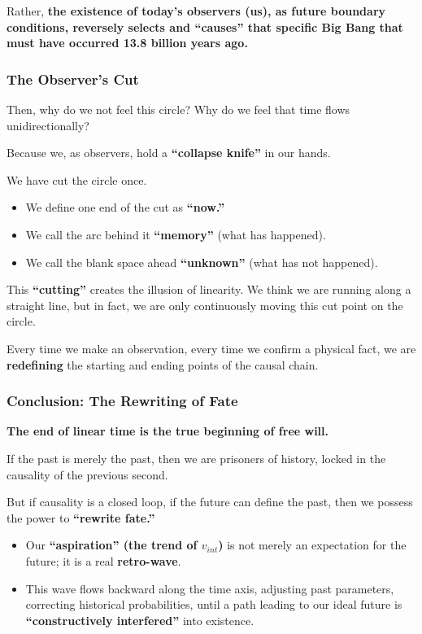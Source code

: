 Rather, \textbf{the existence of today's observers (us), as future boundary conditions, reversely selects and ``causes'' that specific Big Bang that must have occurred 13.8 billion years ago.}

\subsubsection{The Observer's Cut}

Then, why do we not feel this circle? Why do we feel that time flows unidirectionally?

Because we, as observers, hold a \textbf{``collapse knife''} in our hands.

We have cut the circle once.

\begin{itemize}
\item We define one end of the cut as \textbf{``now.''}

\item We call the arc behind it \textbf{``memory''} (what has happened).

\item We call the blank space ahead \textbf{``unknown''} (what has not happened).
\end{itemize}

This \textbf{``cutting''} creates the illusion of linearity. We think we are running along a straight line, but in fact, we are only continuously moving this cut point on the circle.

Every time we make an observation, every time we confirm a physical fact, we are \textbf{redefining} the starting and ending points of the causal chain.

\subsubsection{Conclusion: The Rewriting of Fate}

\textbf{The end of linear time is the true beginning of free will.}

If the past is merely the past, then we are prisoners of history, locked in the causality of the previous second.

But if causality is a closed loop, if the future can define the past, then we possess the power to \textbf{``rewrite fate.''}

\begin{itemize}
\item Our \textbf{``aspiration'' (the trend of $v_{int}$)} is not merely an expectation for the future; it is a real \textbf{retro-wave}.

\item This wave flows backward along the time axis, adjusting past parameters, correcting historical probabilities, until a path leading to our ideal future is \textbf{``constructively interfered''} into existence.
\end{itemize}

